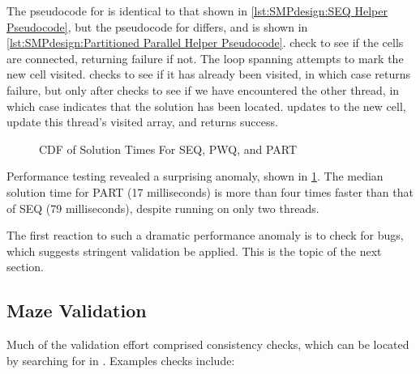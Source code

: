 \begin{fcvref}
The pseudocode for  is identical to that shown in
\cref{lst:SMPdesign:SEQ Helper Pseudocode},
but the pseudocode for  differs, and
is shown in
\cref{lst:SMPdesign:Partitioned Parallel Helper Pseudocode}.
check to see if the cells are connected, returning failure
if not.
The loop spanning  attempts to mark
the new cell visited.
 checks to see if it has already been visited, in which case
 returns failure, but only after 
checks to see if
we have encountered the other thread, in which case  indicates
that the solution has been located.
 updates to the new cell,
 update this thread's visited
array, and  returns success.
\end{fcvref}

\begin{figure}
\centering
{}
\caption{CDF of Solution Times For SEQ, PWQ, and PART}
\label{fig:SMPdesign:CDF of Solution Times For SEQ; PWQ; and PART}
\end{figure}

Performance testing revealed a surprising anomaly, shown in
\cref{fig:SMPdesign:CDF of Solution Times For SEQ; PWQ; and PART}.
The median solution time for PART (17 milliseconds)
is more than four times faster than that of SEQ (79 milliseconds),
despite running on only two threads.

The first reaction to such a dramatic performance anomaly is to check
for bugs, which suggests stringent validation be applied.
This is the topic of the next section.

\subsection{Maze Validation}
\label{sec:SMPdesign:Maze Validation}

Much of the validation effort comprised consistency checks, which
can be located by searching for  in
.
Examples checks include:

